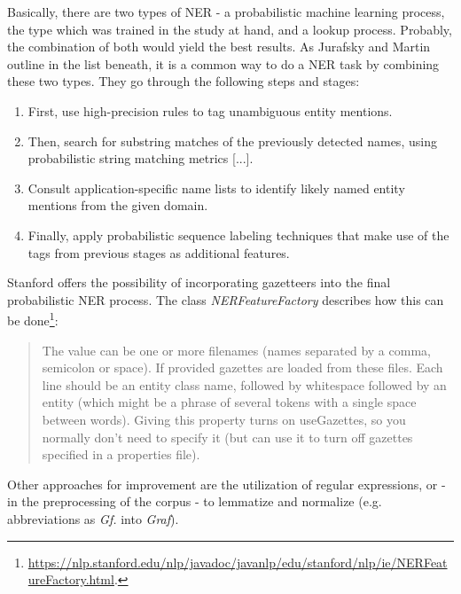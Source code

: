 \documentclass[11pt,a4paper]{article}
\begin{document}
Basically, there are two types of NER - a probabilistic machine learning process, the type which was trained in the study at hand, and a lookup process. Probably, the combination of both would yield the best results. As Jurafsky and Martin \cite{jurafsky_speech_2017} outline in the list beneath, it is a common way to do a NER task by combining these two types. They go through the following steps and stages:

\begin{enumerate}
	\item First, use high-precision rules to tag unambiguous entity mentions. 
	\item Then, search for substring matches of the previously detected names, using probabilistic string matching metrics [...].
	\item Consult application-specific name lists to identify likely named entity mentions from the given domain.
	\item Finally, apply probabilistic sequence labeling techniques that make use of the tags from previous stages as additional features.
\end{enumerate}

Stanford offers the possibility of incorporating gazetteers into the final probabilistic NER process. The class \textit{NERFeatureFactory} describes how this can be done\footnote{\url{https://nlp.stanford.edu/nlp/javadoc/javanlp/edu/stanford/nlp/ie/NERFeatureFactory.html}.}:

\begin{quote}
The value can be one or more filenames (names separated by a comma, semicolon or space). If provided gazettes are loaded from these files. Each line should be an entity class name, followed by whitespace followed by an entity (which might be a phrase of several tokens with a single space between words). Giving this property turns on useGazettes, so you normally don't need to specify it (but can use it to turn off gazettes specified in a properties file).
\end{quote}

Other approaches for improvement are the utilization of regular expressions, or - in the preprocessing of the corpus - to lemmatize and normalize (e.g. abbreviations as \textit{Gf.} into \textit{Graf}).



%
%


\end{document}

